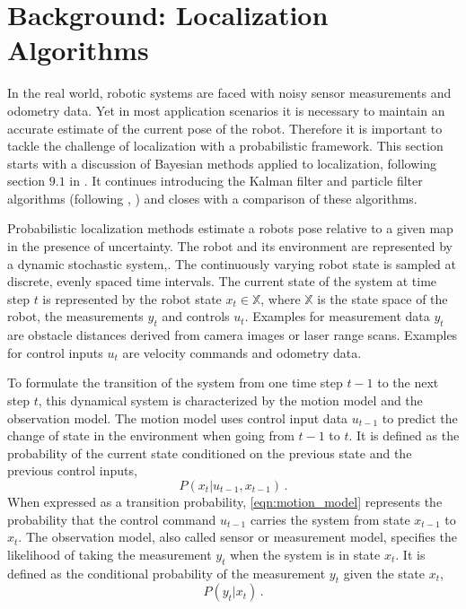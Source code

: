 \documentclass[10pt,journal,compsoc]{IEEEtran}
\begin{document}
\section{Background: Localization Algorithms}
\label{sec:background}
In the real world, robotic systems are faced with noisy sensor measurements and odometry data. Yet in most application scenarios it is necessary to maintain an accurate estimate of the current pose of the robot. Therefore it is important to tackle the challenge of localization with a probabilistic framework. This section starts with a discussion of Bayesian methods applied to localization, following section $9.1$ in \cite{principles_of_robot_motion}. It continues introducing the Kalman filter and particle filter algorithms (following \cite{principles_of_robot_motion}, \cite{monte_carlo_for_mobile_robots}) and closes with a comparison of these algorithms. 

Probabilistic localization methods estimate a robots pose relative to a given map in the presence of uncertainty. The robot and its environment are represented by a dynamic stochastic system,. The continuously varying robot state is sampled at discrete, evenly spaced time intervals. The current state of the system at time step $t$ is represented by the robot state $x_t \in \mathbb{X}$, where $\mathbb{X}$ is the state space of the robot, the measurements $y_t$ and controls $u_t$. Examples for measurement data $y_t$ are obstacle distances derived from camera images or laser range scans. Examples for control inputs $u_t$ are velocity commands and odometry data.

To formulate the transition of the system from one time step $t-1$ to the next step $t$, this dynamical system is characterized by the motion model and the observation model. The motion model uses control input data $u_{t-1}$ to predict the change of state in the environment when going from $t-1$ to $t$. It is defined as the probability of the current state conditioned on the previous state and the previous control inputs,
\begin{equation}
\label{eqn:motion_model}
P \left( x_t \vert u_{t-1}, x_{t-1} \right) \, .
\end{equation}
When expressed as a transition probability, \ref{eqn:motion_model} represents the probability that the control command $u_{t-1}$ carries the system from state $x_{t-1}$ to $x_t$. The observation model, also called sensor or measurement model, specifies the likelihood of taking the measurement $y_t$ when the system is in state $x_t$. It is defined as the conditional probability of the measurement $y_t$ given the state $x_t$, 
\begin{equation}
\label{eqn:observation_model}
P \left( y_t \vert x_t \right) \, .
\end{equation} 
\end{document}
